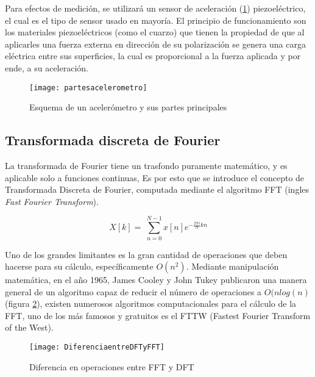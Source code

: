 			Para efectos de medición, se utilizará un sensor de aceleración (\ref{fig:acellpartes}) piezoeléctrico, el cual es el tipo de sensor usado en mayoría. El principio de funcionamiento son los materiales piezoeléctricos (como el cuarzo) que tienen la propiedad de que al aplicarles una fuerza externa en dirección de su polarización se genera una carga eléctrica entre sus superficies, la cual es proporcional a la fuerza aplicada y por ende, a su aceleración. \\			
			\begin{figure}[t]
				\centering
				\texttt{[image: partesacelerometro]}
				\caption{Esquema de un acelerómetro y sus partes principales}
				\label{fig:acellpartes}
			\end{figure}
		\subsection{Transformada discreta de Fourier}
			La transformada de Fourier tiene un trasfondo puramente matemático, y es aplicable solo a funciones continuas, Es por esto que se introduce el concepto de Transformada Discreta de Fourier, computada mediante el algoritmo FFT (ingles \textit{Fast Fourier Transform}).
			
			\begin{equation}
				X\left[k\right]=\ \sum_{n=0}^{N-1}x[n]e^{-\frac{2\pi{}i}{N}kn}
				\label{eq:discretafourier}
			\end{equation}
			
			Uno de los grandes limitantes es la gran cantidad de operaciones que deben hacerse para su cálculo, específicamente $ O( n^2 ) $. Mediante manipulación matemática, en el año 1965, James Cooley y John Tukey publicaron una manera general de un algoritmo capaz de reducir el número de operaciones a $O(n log(n)$ (figura \ref{fig:diffftdft}), existen numerosos algoritmos computacionales para el cálculo de la FFT, uno de los más famosos y gratuitos es el FTTW (Fastest Fourier Transform of the West).
			\begin{figure}
				\centering
				\texttt{[image: DiferenciaentreDFTyFFT]}
				\caption{Diferencia en operaciones entre FFT y DFT}
				\label{fig:diffftdft}
			\end{figure}
